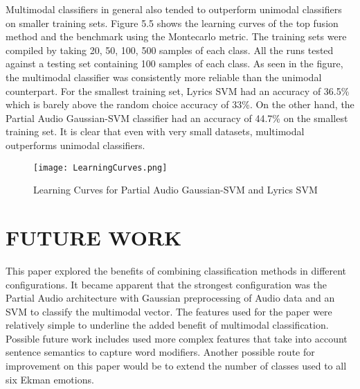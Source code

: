 Multimodal classifiers in general also tended to outperform unimodal 
classifiers on smaller training sets. Figure 5.5 shows the learning curves 
of the top fusion method and the benchmark using the Montecarlo 
metric. The training sets were compiled by taking 20, 50, 100, 500 
samples of each class. All the runs tested against a testing set containing 
100 samples of each class.  As seen in the figure, the multimodal classifier 
was consistently more reliable than the unimodal counterpart. For the 
smallest training set, Lyrics SVM  had an accuracy of 36.5\% which is barely
 above the random choice accuracy of 33\%. On the other hand, the Partial 
 Audio Gaussian-SVM classifier had an accuracy of 44.7\% on the smallest training set.
  It is clear that  even with very small datasets, multimodal outperforms unimodal classifiers. 

\begin{figure}
 \centering
 \texttt{[image: LearningCurves.png]} 
 \caption{Learning Curves for Partial Audio Gaussian-SVM and Lyrics SVM}
\end{figure}


\chapter{FUTURE WORK}
This paper explored the benefits of combining classification methods in 
different configurations. It became apparent that the strongest configuration 
was the Partial Audio architecture with Gaussian preprocessing of Audio 
data and an SVM to classify the multimodal vector.  The features used for 
the paper were relatively simple to underline the added benefit of multimodal 
classification. Possible future work includes used more complex features that 
take into account sentence semantics to capture word modifiers. Another 
possible route for improvement on this paper would be to extend the number 
of classes used to all six Ekman emotions. 


